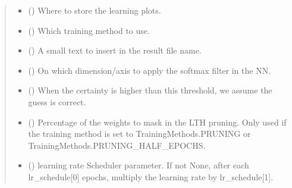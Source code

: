 \documentclass[letterpaper,10pt,english]{sphinxmanual}
\begin{document}
\begin{fulllineitems}
\begin{fulllineitems}
\begin{quote}
\begin{description}
\begin{itemize}
\item {} 
\sphinxAtStartPar
{} (\sphinxstyleliteralemphasis{\sphinxupquote{, }}) \textendash{} Where to store the learning plots.

\item {} 
\sphinxAtStartPar
{} (\sphinxstyleliteralemphasis{\sphinxupquote{, }}) \textendash{} Which training method to use.

\item {} 
\sphinxAtStartPar
{} (\sphinxstyleliteralemphasis{\sphinxupquote{, }}) \textendash{} A small text to insert in the result file name.

\item {} 
\sphinxAtStartPar
{} (\sphinxstyleliteralemphasis{\sphinxupquote{, }}) \textendash{} On which dimension/axis to apply the softmax filter in the NN.

\item {} 
\sphinxAtStartPar
{} (\sphinxstyleliteralemphasis{\sphinxupquote{, }}) \textendash{} When the certainty is higher than this threshold, we assume the guess is correct.

\item {} 
\sphinxAtStartPar
{} (\sphinxstyleliteralemphasis{\sphinxupquote{, }}) \textendash{} Percentage of the weights to mask in the LTH pruning. Only used if the training
method is set to TrainingMethods.PRUNING or TrainingMethods.PRUNING\_HALF\_EPOCHS.

\item {} 
\sphinxAtStartPar
{} (\sphinxstyleliteralemphasis{\sphinxupquote{{[}}}\sphinxstyleliteralemphasis{\sphinxupquote{,}}\sphinxstyleliteralemphasis{\sphinxupquote{{]} }}\sphinxstyleliteralemphasis{\sphinxupquote{| }}) \textendash{} learning rate Scheduler parameter. If not None, after each lr\_schedule{[}0{]} epochs,
multiply the learning rate by lr\_schedule{[}1{]}.


\end{itemize}
\end{description}
\end{quote}
\end{fulllineitems}
\end{fulllineitems}
\end{document}
